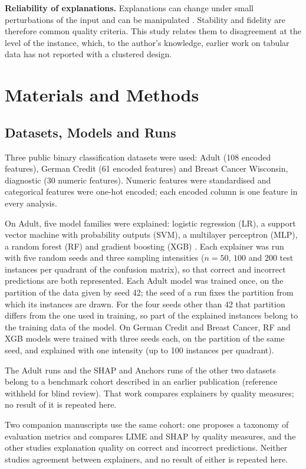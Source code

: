 \documentclass{cys}
\newif\iffull
\begin{document}
\textbf{Reliability of explanations.} Explanations can change under small perturbations
of the input \cite{alvarezmelis2018robustness} and can be manipulated
\cite{slack2020fooling}. Stability and fidelity are therefore common quality criteria.
This study relates them to disagreement at the level of the instance, which, to the author's knowledge, earlier work on tabular data has not reported with a
clustered design.

\section{Materials and Methods}
\label{sec:methods}

\subsection{Datasets, Models and Runs}

Three public binary classification datasets were used: Adult \cite{becker1996adult}
(108 encoded features), German Credit \cite{hofmann1994statlog} (61 encoded features) and
Breast Cancer Wisconsin, diagnostic \cite{wolberg1993breast} (30 numeric features).
Numeric features were standardised and categorical features were one-hot encoded; each
encoded column is one feature in every analysis.

On Adult, five model families were explained: logistic regression (LR), a support
vector machine with probability outputs (SVM), a multilayer perceptron (MLP), a random
forest (RF) \cite{breiman2001random} and gradient boosting (XGB) \cite{chen2016xgboost}.
Each explainer was run with five random seeds and three sampling intensities
($n = 50$, $100$ and $200$ test instances per quadrant of the confusion matrix), so that
correct and incorrect predictions are both represented. Each Adult model was trained once, on the partition of the data given by seed 42; the
seed of a run fixes the partition from which its instances are drawn. For the four seeds
other than 42 that partition differs from the one used in training, so part of the
explained instances belong to the training data of the model. On German Credit and Breast
Cancer, RF and XGB models were trained with three seeds each, on the partition of the same
seed, and explained with one intensity (up to 100 instances per quadrant).

\iffull
The Adult runs and the SHAP and Anchors runs of the other two datasets belong to a
benchmark cohort described in \cite{herrera2026framework}. That work compares explainers
by quality measures; no result of it is repeated here.
\else
The Adult runs and the SHAP and Anchors runs of the other two datasets belong to a
benchmark cohort described in an earlier publication (reference withheld for blind
review). That work compares explainers by quality measures; no result of it is repeated
here.
\fi
Two companion manuscripts use the same cohort: one proposes a taxonomy of evaluation
metrics and compares LIME and SHAP by quality measures, and the other studies explanation
quality on correct and incorrect predictions. Neither studies agreement between
explainers, and no result of either is repeated here.
\end{document}
